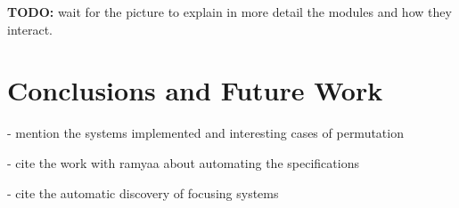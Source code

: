 \documentclass{llncs}
\begin{document}
\textbf{TODO:} wait for the picture to explain in more detail the modules and how they
interact.

\section{Conclusions and Future Work}

- mention the systems implemented and interesting cases of permutation

- cite the work with ramyaa about automating the specifications

- cite the automatic discovery of focusing systems


% 
% 
\end{document}
